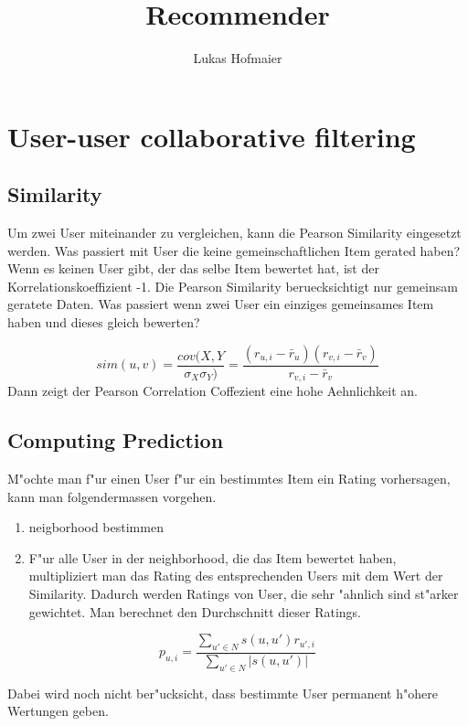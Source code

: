 \documentclass[a4paper, 11pt]{article}
\author{Lukas Hofmaier}
\title{Recommender}
\begin{document}
\maketitle
\section{User-user collaborative filtering}
\subsection{Similarity}
Um zwei User miteinander zu vergleichen, kann die Pearson Similarity eingesetzt werden.
Was passiert mit User die keine gemeinschaftlichen Item gerated haben? 
Wenn es keinen User gibt, der das selbe Item bewertet hat, ist der Korrelationskoeffizient -1.
Die Pearson Similarity beruecksichtigt nur gemeinsam geratete Daten.
Was passiert wenn zwei User ein einziges gemeinsames Item haben und dieses gleich bewerten?


\begin{equation}
 sim(u,v) = \frac{cov(X,Y}{\sigma_X \sigma_Y)} = \frac{(r_{u,i} - \bar{r}_u)(r_{v,i} - \bar{r}_v)}{r_{v,i} - \bar{r}_v}    
\end{equation}
Dann zeigt der Pearson Correlation Coffezient eine hohe Aehnlichkeit an.

\subsection{Computing Prediction}
\label{sec:compp}

M"ochte man f"ur einen User f"ur ein bestimmtes Item ein Rating vorhersagen, kann man folgendermassen vorgehen.

\begin{enumerate}
\item neigborhood bestimmen
\item F"ur alle User in der neighborhood, die das Item bewertet haben, multipliziert man das Rating des entsprechenden Users mit dem Wert der Similarity. Dadurch werden Ratings von User, die sehr "ahnlich sind st"arker gewichtet. Man berechnet den Durchschnitt dieser Ratings.

\end{enumerate}

\begin{equation}
  \label{eq:computeprediction}
  p_{u,i} = \frac{\sum_{u' \in N}{s(u,u') r_{u',i}}}{\sum_{u' \in N}{|s(u,u')|}}
\end{equation}

Dabei wird noch nicht ber"ucksicht, dass bestimmte User permanent h"ohere Wertungen geben.
\end{document}
